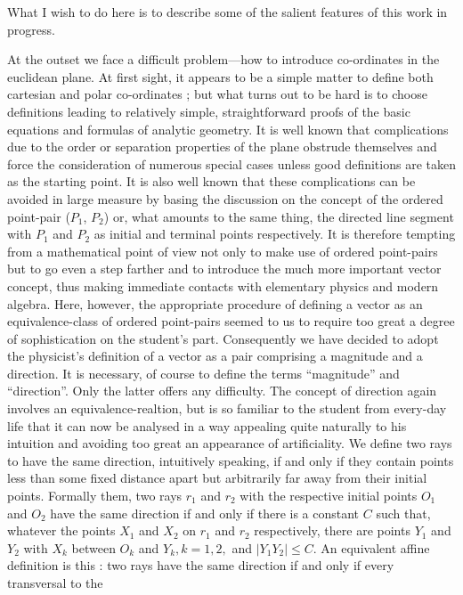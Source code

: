 What I wish to do here is to describe some of the salient features of
this work in progress.

At the outset we face a difficult problem---how to introduce
co-ordinates in the euclidean plane. At first sight, it appears to be
a simple matter to define both cartesian and polar co-ordinates ; but
what turns out to be hard is to choose definitions leading to
relatively simple, straightforward proofs of the basic equations and
formulas of analytic geometry. It is well known that complications due
to the order or separation properties of the plane obstrude themselves
and force the consideration of numerous special cases unless good
definitions are taken as the starting point. It is also well known
that these complications  can be avoided in large measure by basing
the discussion on the concept of the ordered point-pair ($P_1$, $P_2$)
or, what amounts to the same thing, the directed  line segment with
$P_1$ and $P_2$ as initial and terminal points respectively. It is
therefore tempting from a mathematical point of view not only to make
use of ordered point-pairs but to go even a step farther and to
introduce the much more important vector concept, thus making
immediate contacts with elementary physics and modern algebra. Here,
however, the appropriate procedure of defining a vector as an
equivalence-class of ordered point-pairs seemed to us to require too
great a degree of sophistication on the student's part. Consequently
we have decided to adopt the physicist's definition of a vector as a
pair comprising a magnitude and a direction. It is necessary, of
course to define the terms ``magnitude'' and ``direction''. Only the
latter offers any difficulty. The concept of direction again involves
an equivalence-realtion, but is so familiar to the\pageoriginale
student from every-day life that it can now be analysed in a way
appealing quite naturally to his intuition and avoiding too great an
appearance of artificiality. We define two rays to have the same
direction, intuitively speaking, if and only if they contain points
less than some fixed distance apart but arbitrarily far away from
their initial points. Formally them, two rays $r_1$ and $r_2$ with the
respective initial points $O_1$ and $O_2$ have the same direction if
and only if there is a constant $C$ such that, whatever the points
$X_1$ and $X_2$ on $r_1$ and $r_2$ respectively, there are points
$Y_1$ and $Y_2$ with $X_k$ between $O_k$ and $Y_k, k = 1, 2,$ and
$|Y_1 Y_2| \leq C$. An equivalent affine definition is this : two rays
have the same direction if and only if every transversal to the
